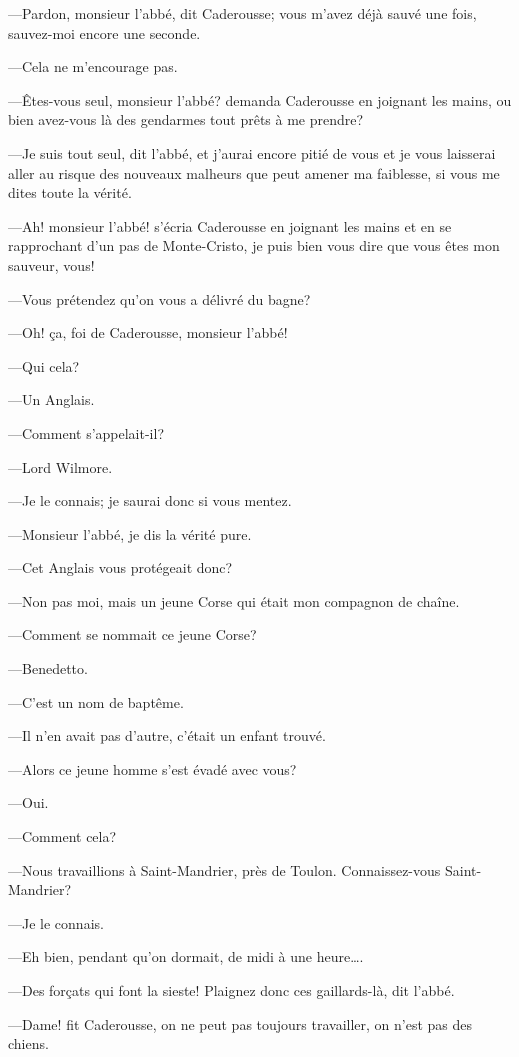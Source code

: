 —Pardon, monsieur l'abbé, dit Caderousse; vous m'avez déjà sauvé une fois, sauvez-moi encore une seconde. 

—Cela ne m'encourage pas. 

—Êtes-vous seul, monsieur l'abbé? demanda Caderousse en joignant les mains, ou bien avez-vous là des gendarmes tout prêts à me prendre? 

—Je suis tout seul, dit l'abbé, et j'aurai encore pitié de vous et je vous laisserai aller au risque des nouveaux malheurs que peut amener ma faiblesse, si vous me dites toute la vérité. 

—Ah! monsieur l'abbé! s'écria Caderousse en joignant les mains et en se rapprochant d'un pas de Monte-Cristo, je puis bien vous dire que vous êtes mon sauveur, vous! 

—Vous prétendez qu'on vous a délivré du bagne? 

—Oh! ça, foi de Caderousse, monsieur l'abbé! 

—Qui cela? 

—Un Anglais. 

—Comment s'appelait-il? 

—Lord Wilmore. 

—Je le connais; je saurai donc si vous mentez. 

—Monsieur l'abbé, je dis la vérité pure. 

—Cet Anglais vous protégeait donc? 

—Non pas moi, mais un jeune Corse qui était mon compagnon de chaîne. 

—Comment se nommait ce jeune Corse? 

—Benedetto. 

—C'est un nom de baptême. 

—Il n'en avait pas d'autre, c'était un enfant trouvé. 

—Alors ce jeune homme s'est évadé avec vous? 

—Oui. 

—Comment cela? 

—Nous travaillions à Saint-Mandrier, près de Toulon. Connaissez-vous Saint-Mandrier? 

—Je le connais. 

—Eh bien, pendant qu'on dormait, de midi à une heure\dots. 

—Des forçats qui font la sieste! Plaignez donc ces gaillards-là, dit l'abbé.  

—Dame! fit Caderousse, on ne peut pas toujours travailler, on n'est pas des chiens. 

